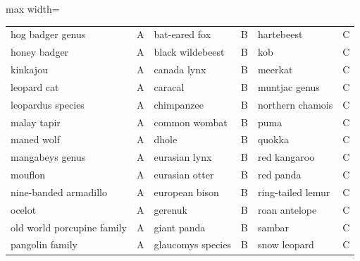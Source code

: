 \begin{table}[p]
\begin{adjustbox}{max width=\textwidth}
\begin{tabular}{@{}llllll@{}}
    hog badger genus & A & bat-eared fox & B & hartebeest & C \\
    honey badger & A & black wildebeest & B & kob & C \\
    kinkajou & A & canada lynx & B & meerkat & C \\
    leopard cat & A & caracal & B & muntjac genus & C \\
    leopardus species & A & chimpanzee & B & northern chamois & C \\
    malay tapir & A & common wombat & B & puma & C \\
    maned wolf & A & dhole & B & quokka & C \\
    mangabeys genus & A & eurasian lynx & B & red kangaroo & C \\
    mouflon & A & eurasian otter & B & red panda & C \\
    nine-banded armadillo & A & european bison & B & ring-tailed lemur & C \\
    ocelot & A & gerenuk & B & roan antelope & C \\
    old world porcupine family & A & giant panda & B & sambar & C \\
    pangolin family & A & glaucomys species & B & snow leopard & C \\
    \bottomrule
\end{tabular}
\end{adjustbox}
\end{table}

